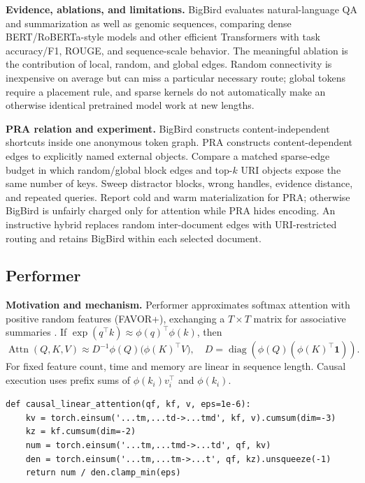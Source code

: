 \textbf{Evidence, ablations, and limitations.} BigBird evaluates natural-language QA and
summarization as well as genomic sequences, comparing dense BERT/RoBERTa-style models and
other efficient Transformers with task accuracy/F1, ROUGE, and sequence-scale behavior.
The meaningful ablation is the contribution of local, random, and global edges.  Random
connectivity is inexpensive on average but can miss a particular necessary route;
global tokens require a placement rule, and sparse kernels do not automatically make an
otherwise identical pretrained model work at new lengths.

\textbf{PRA relation and experiment.} BigBird constructs content-independent shortcuts
inside one anonymous token graph.  PRA constructs content-dependent edges to explicitly
named external objects.  Compare a matched sparse-edge budget in which random/global block
edges and top-$k$ URI objects expose the same number of keys.  Sweep distractor blocks,
wrong handles, evidence distance, and repeated queries.  Report cold and warm materialization
for PRA; otherwise BigBird is unfairly charged only for attention while PRA hides encoding.
An instructive hybrid replaces random inter-document edges with URI-restricted routing and
retains BigBird within each selected document.

\subsection{Performer}

\textbf{Motivation and mechanism.} Performer approximates softmax attention with positive
random features (FAVOR+), exchanging a $T\times T$ matrix for associative summaries
\citep{choromanski2021performer}.  If
$\exp(q^\top k)\approx\phi(q)^\top\phi(k)$, then
\begin{equation}
\operatorname{Attn}(Q,K,V)\approx
D^{-1}\phi(Q)\bigl(\phi(K)^\top V\bigr),
\quad D=\operatorname{diag}(\phi(Q)(\phi(K)^\top\mathbf1)).
\end{equation}
For fixed feature count, time and memory are linear in sequence length.  Causal execution
uses prefix sums of $\phi(k_i)v_i^\top$ and $\phi(k_i)$.

\begin{lstlisting}[caption={Causal kernel-attention recurrence; phi must be a positive feature map}]
def causal_linear_attention(qf, kf, v, eps=1e-6):
    kv = torch.einsum('...tm,...td->...tmd', kf, v).cumsum(dim=-3)
    kz = kf.cumsum(dim=-2)
    num = torch.einsum('...tm,...tmd->...td', qf, kv)
    den = torch.einsum('...tm,...tm->...t', qf, kz).unsqueeze(-1)
    return num / den.clamp_min(eps)
\end{lstlisting}

